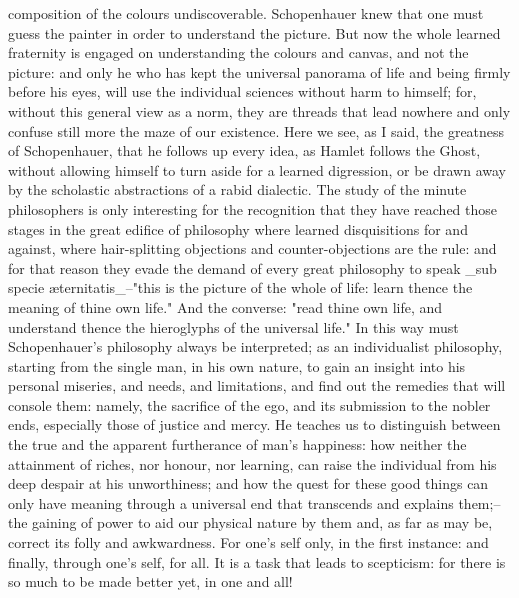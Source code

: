 composition of the colours undiscoverable. Schopenhauer knew that one
must guess the painter in order to understand the picture. But now
the whole learned fraternity is engaged on understanding the colours
and canvas, and not the picture: and only he who has kept the
universal panorama of life and being firmly before his eyes, will use
the individual sciences without harm to himself; for, without this
general view as a norm, they are threads that lead nowhere and only
confuse still more the maze of our existence. Here we see, as I said,
the greatness of Schopenhauer, that he follows up every idea, as
Hamlet follows the Ghost, without allowing himself to turn aside for
a learned digression, or be drawn away by the scholastic abstractions
of a rabid dialectic. The study of the minute philosophers is only
interesting for the recognition that they have reached those stages
in the great edifice of philosophy where learned disquisitions for
and against, where hair-splitting objections and counter-objections
are the rule: and for that reason they evade the demand of every
great philosophy to speak _sub specie æternitatis_--"this is the
picture of the whole of life: learn thence the meaning of thine own
life." And the converse: "read thine own life, and understand thence
the hieroglyphs of the universal life." In this way must
Schopenhauer's philosophy always be interpreted; as an individualist
philosophy, starting from the single man, in his own nature, to gain
an insight into his personal miseries, and needs, and limitations,
and find out the remedies that will console them: namely, the
sacrifice of the ego, and its submission to the nobler ends,
especially those of justice and mercy. He teaches us to distinguish
between the true and the apparent furtherance of man's happiness: how
neither the attainment of riches, nor honour, nor learning, can raise
the individual from his deep despair at his unworthiness; and how the
quest for these good things can only have meaning through a universal
end that transcends and explains them;--the gaining of power to aid
our physical nature by them and, as far as may be, correct its folly
and awkwardness. For one's self only, in the first instance: and
finally, through one's self, for all. It is a task that leads to
scepticism: for there is so much to be made better yet, in one and
all!

